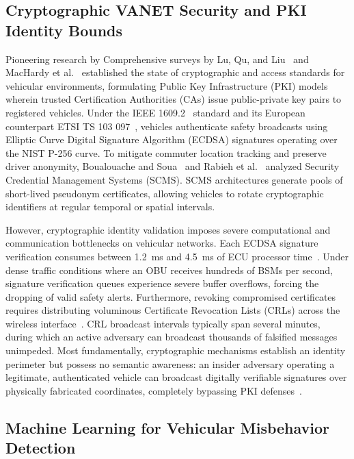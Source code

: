 \documentclass[conference]{IEEEtran}
\begin{document}
\subsection{Cryptographic VANET Security and PKI Identity Bounds}

Pioneering research by Comprehensive surveys by Lu, Qu, and Liu~\cite{raya} and MacHardy et al.~\cite{karagiannis2011vehicular} established the state of cryptographic and access standards for vehicular environments, formulating Public Key Infrastructure (PKI) models wherein trusted Certification Authorities (CAs) issue public-private key pairs to registered vehicles. Under the IEEE 1609.2~\cite{ieee16092} standard and its European counterpart ETSI TS 103 097~\cite{etsi103097}, vehicles authenticate safety broadcasts using Elliptic Curve Digital Signature Algorithm (ECDSA) signatures operating over the NIST P-256 curve. To mitigate commuter location tracking and preserve driver anonymity, Boualouache and Soua~\cite{whyte2013security} and Rabieh et al.~\cite{brech2018} analyzed Security Credential Management Systems (SCMS). SCMS architectures generate pools of short-lived pseudonym certificates, allowing vehicles to rotate cryptographic identifiers at regular temporal or spatial intervals. 

However, cryptographic identity validation imposes severe computational and communication bottlenecks on vehicular networks. Each ECDSA signature verification consumes between 1.2~ms and 4.5~ms of ECU processor time~\cite{kargl2008secure, karagiannis2011vehicular}. Under dense traffic conditions where an OBU receives hundreds of BSMs per second, signature verification queues experience severe buffer overflows, forcing the dropping of valid safety alerts. Furthermore, revoking compromised certificates requires distributing voluminous Certificate Revocation Lists (CRLs) across the wireless interface~\cite{whyte2013security, brech2018}. CRL broadcast intervals typically span several minutes, during which an active adversary can broadcast thousands of falsified messages unimpeded. Most fundamentally, cryptographic mechanisms establish an identity perimeter but possess no semantic awareness: an insider adversary operating a legitimate, authenticated vehicle can broadcast digitally verifiable signatures over physically fabricated coordinates, completely bypassing PKI defenses~\cite{veremi, kamel2020veremi}.

\subsection{Machine Learning for Vehicular Misbehavior Detection}
\end{document}
